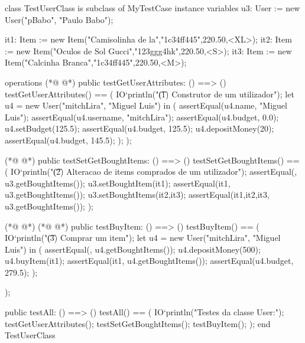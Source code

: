 \begin{vdmpp}[breaklines=true]
class TestUserClass is subclass of MyTestCase
 instance variables
  u3: User := new User("pBabo", "Paulo Babo");
  
  it1: Item := new Item("Camisolinha de la","1c34ff445",220.50,<XL>);
  it2: Item := new Item("Oculos de Sol Gucci","123ggg4hk",220.50,<S>);
  it3: Item := new Item("Calcinha Branca","1c34ff445",220.50,<M>);
  
 operations
(*@
\label{testGetUserAttributes:10}
@*)
  public testGetUserAttributes: () ==> ()
   testGetUserAttributes() == (
     IO`println("\t (1) Construtor de um utilizador");
    let u4 = new User("mitchLira", "Miguel Luis") in (
     assertEqual(u4.name, "Miguel Luis");
     assertEqual(u4.username, "mitchLira");
     assertEqual(u4.budget, 0.0);
     u4.setBudget(125.5);
     assertEqual(u4.budget, 125.5);
     u4.depositMoney(20);
     assertEqual(u4.budget, 145.5);
    );
  ); 
  
   
(*@
\label{testSetGetBoughtItems:25}
@*)
  public testSetGetBoughtItems: () ==> ()
   testSetGetBoughtItems() == (
     IO`println("\t (2) Alteracao de items comprados de um utilizador");
    assertEqual({}, u3.getBoughtItems());
    u3.setBoughtItem(it1);
    assertEqual({it1}, u3.getBoughtItems());
    u3.setBoughtItems({it2,it3});
    assertEqual({it1,it2,it3}, u3.getBoughtItems());
   );
   
(*@
\label{testBuyItem:35}
@*)
(*@
\label{testAll:35}
@*)
   public testBuyItem: () ==> ()
   testBuyItem() == (
   IO`println("\t (3) Comprar um item");
   let u4 = new User("mitchLira", "Miguel Luis") in (
    assertEqual({}, u4.getBoughtItems());
    u4.depositMoney(500);
    u4.buyItem(it1);
    assertEqual({it1}, u4.getBoughtItems());
    assertEqual(u4.budget, 279.5);
    );
     
    
   );
  
  
  public testAll: () ==> ()
   testAll() == (
   IO`println("Testes da classe User:");
    testGetUserAttributes();
    testSetGetBoughtItems();
    testBuyItem();
   );
end TestUserClass
\end{vdmpp}

